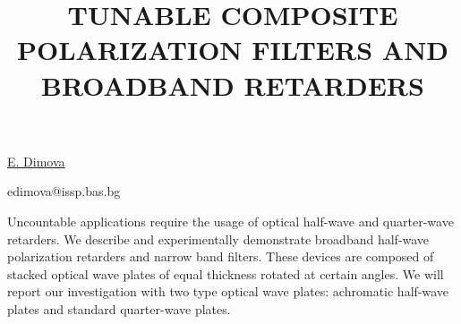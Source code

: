 \title{TUNABLE COMPOSITE POLARIZATION FILTERS AND BROADBAND RETARDERS}

\underline{E. Dimova}%

{\normalsize{
\vspace{-4mm} \ssinstitute



\email edimova@issp.bas.bg}}

Uncountable applications require the usage of optical half-wave and quarter-wave retarders. We describe and experimentally demonstrate broadband half-wave polarization retarders and narrow band filters. These devices are composed of stacked optical wave plates of equal thickness rotated at certain angles. We will report our investigation with two type optical wave plates: achromatic half-wave plates and standard quarter-wave plates.

\vspace{\baselineskip}
